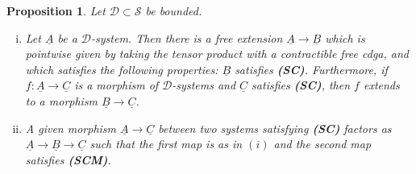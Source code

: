 \documentclass[12pt,a4paper]{article}
\newtheorem{prop}[thm]{Proposition}
\theoremstyle{definition}
\begin{document}
\begin{prop}\label{prop:SCexistence} Let $\mathcal{D}\subset\mathcal{S}$ be bounded.
\begin{enumerate}[(i)]
\item  Let $\underline{A}$ be a $\mathcal{D}$-system. Then there is a free extension $\underline{A}\rightarrow \underline{B}$ which is pointwise given by taking the tensor product with a contractible free cdga, and  which satisfies the following properties: $\underline{B}$ satisfies \textbf{(SC)}. Furthermore, if $f\colon\underline{A}\rightarrow \underline{C}$ is a morphism of $\mathcal{D}$-systems and $\underline{C}$ satisfies \textbf{(SC)}, then $f$ extends to a morphism $\underline{B}\rightarrow\underline{C}$.
\item A given morphism $\underline{A}\rightarrow \underline{C}$ between two systems satisfying \textbf{(SC)} factors as $\underline{A}\rightarrow\underline{B}\rightarrow \underline{C}$ such that the first map is as in $(i)$ and the second map satisfies \textbf{(SCM)}.
\end{enumerate}
\end{prop}
\end{document}
